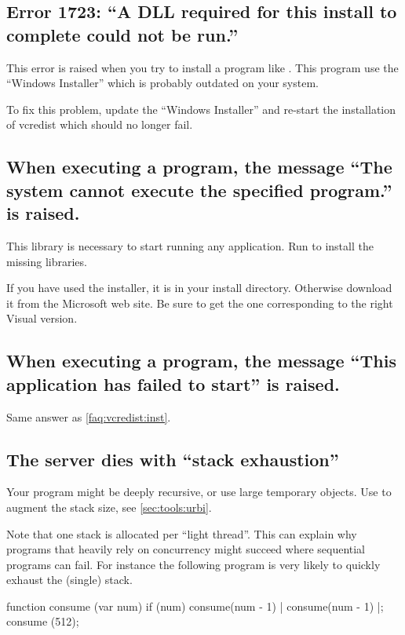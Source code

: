 \subsection{Error 1723: ``A DLL required for this install to complete could
  not be run.''}

This error is raised when you try to install a program like
.  This program use the ``Windows Installer''
which is probably outdated on your system.

To fix this problem, update the ``Windows Installer'' and re-start the
installation of vcredist which should no longer fail.

\subsection{When executing a program, the message ``The system cannot
  execute the specified program.'' is raised.}
\label{faq:vcredist:inst}

This library is necessary to start running any application.  Run
 to install the missing libraries.

If you have used the \usdk installer, it is  in
your install directory.  Otherwise download it from the Microsoft web site.
Be sure to get the one corresponding to the right Visual \Cxx version.

\subsection{When executing a program, the message ``This application has
  failed to start'' is raised.}

Same answer as \autoref{faq:vcredist:inst}.

\subsection{The server dies with ``stack exhaustion''}
Your program might be deeply recursive, or use large temporary
objects.  Use  to augment the stack size, see
\autoref{sec:tools:urbi}.

Note that one stack is allocated per ``light thread''.  This can
explain why programs that heavily rely on concurrency might succeed
where sequential programs can fail.  For instance the following
program is very likely to quickly exhaust the (single) stack.

\begin{urbiunchecked}
function consume (var num)
{
  if (num)
    consume(num - 1) | consume(num - 1)
}|;
consume (512);
\end{urbiunchecked}

